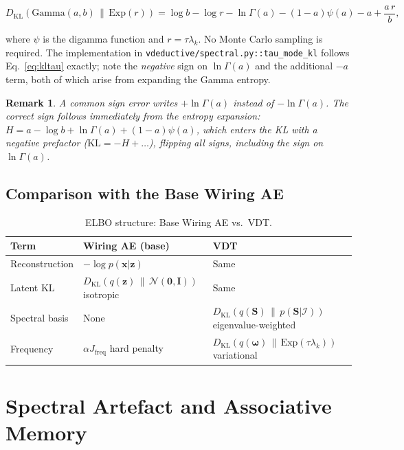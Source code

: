 \documentclass[11pt,a4paper]{article}
\newtheorem{remark}{Remark}
\newcommand{\KL}[2]{D_{\mathrm{KL}}\!\left(#1\,\|\,#2\right)}
\newcommand{\Smat}{\mathbf{S}}
\newcommand{\normal}{\mathcal{N}}
\begin{document}
\begin{equation}
  \KL{\mathrm{Gamma}(a,b)}{\mathrm{Exp}(r)}
  = \log b - \log r - \ln\Gamma(a) - (1-a)\psi(a) - a + \frac{a\,r}{b},
  \label{eq:kltau}
\end{equation}

where $\psi$ is the digamma function and $r = \tau\lambda_k$.
No Monte Carlo sampling is required.
The implementation in \texttt{vdeductive/spectral.py::tau\_mode\_kl} follows
Eq.~\eqref{eq:kltau} exactly; note the \emph{negative} sign on
$\ln\Gamma(a)$ and the additional $-a$ term, both of which arise from
expanding the Gamma entropy.

\begin{remark}
A common sign error writes $+\ln\Gamma(a)$ instead of $-\ln\Gamma(a)$.
The correct sign follows immediately from the entropy expansion:
$H = a - \log b + \ln\Gamma(a) + (1-a)\psi(a)$, which enters the KL
with a \emph{negative} prefactor ($\mathrm{KL} = -H + \ldots$), flipping
all signs, including the sign on $\ln\Gamma(a)$.
\end{remark}

\subsection{Comparison with the Base Wiring AE}
\label{sec:elbo:comparison}

\begin{table}[ht]
  \centering
  \caption{ELBO structure: Base Wiring AE vs.\ VDT.}
  \label{tab:elbo}
  \begin{tabular}{lll}
    \toprule
    \textbf{Term} & \textbf{Wiring AE (base)} & \textbf{VDT} \\
    \midrule
    Reconstruction   & $-\log p(\mathbf{x}|\mathbf{z})$         & Same \\
    Latent KL        & $\KL{q(\mathbf{z})}{\normal(\mathbf{0},\mathbf{I})}$ isotropic & Same \\
    Spectral basis   & None                          & $\KL{q(\Smat)}{p(\Smat|\mathcal{I})}$ eigenvalue-weighted \\
    Frequency        & $\alpha J_{\text{freq}}$ hard penalty & $\KL{q(\boldsymbol{\omega})}{\mathrm{Exp}(\tau\lambda_k)}$ variational \\
    \bottomrule
  \end{tabular}
\end{table}

\section{Spectral Artefact and Associative Memory}
\label{sec:memory}
\end{document}
